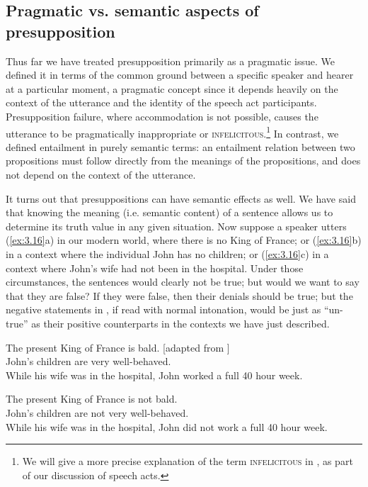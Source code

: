 \subsection{Pragmatic vs. semantic aspects of presupposition}\label{sec:3.4.3}

Thus far we have treated presupposition primarily as a pragmatic issue. We defined it in terms of the common ground between a specific speaker and hearer at a particular moment, a pragmatic concept since it depends heavily on the context of the utterance and the identity of the speech act participants. Presupposition failure, where accommodation is not possible, causes the utterance to be pragmatically inappropriate or \textsc{infelicitous}.\footnote{We will give a more precise explanation of the term \textsc{infelicitous} in , as part of our discussion of speech acts.} In contrast, we defined entailment in purely semantic terms: an entailment relation between two propositions must follow directly from the meanings of the propositions, and does not depend on the context of the utterance.



It turns out that presuppositions can have semantic effects as well. We have said that knowing the meaning (i.e. semantic content) of a sentence allows us to determine its truth value in any given situation. Now suppose a speaker utters (\ref{ex:3.16}a) in our modern world, where there is no King of France; or (\ref{ex:3.16}b) in a context where the individual John has no children; or (\ref{ex:3.16}c) in a context where John’s wife had not been in the hospital. Under those circumstances, the sentences would clearly not be true; but would we want to say that they are false? If they were false, then their denials should be true; but the negative statements in , if read with normal intonation, would be just as “un-true” as their positive counterparts in the contexts we have just described.


\ea \label{ex:3.16}
\ea The present King of France is bald.  [adapted from \citet{Russell1905}]\\
\ex John’s children are very well-behaved.\\
\ex While his wife was in the hospital, John worked a full 40 hour week.
                       \z
\z

\ea \label{ex:3.17}
\ea The present King of France is not bald.\\
\ex John’s children are not very well-behaved.\\
\ex While his wife was in the hospital, John did not work a full 40 hour week.
                       \z
\z


